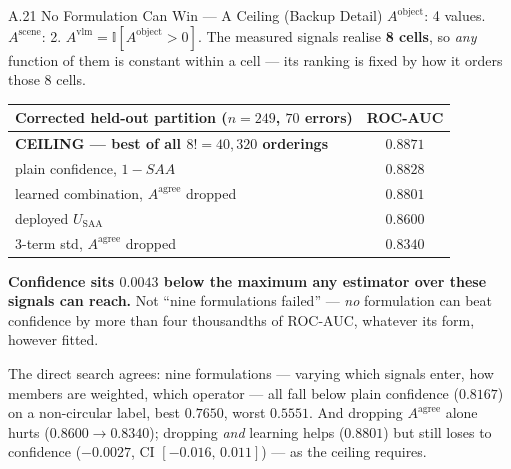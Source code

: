 \documentclass[aspectratio=169,11pt]{beamer}
\begin{document}
\begin{frame}{A.21 No Formulation Can Win --- A Ceiling (Backup Detail)}
\scriptsize
$A^{\text{object}}$: 4 values. $A^{\text{scene}}$: 2. $A^{\text{vlm}}=\mathbb{I}[A^{\text{object}}>0]$. The measured signals realise \textbf{8 cells}, so \emph{any} function of them is constant within a cell --- its ranking is fixed by how it orders those 8 cells.
\vspace{1mm}
\begin{center}
\footnotesize
\begin{tabular}{@{}l c@{}}
\toprule
\textbf{Corrected held-out partition ($n=249$, $70$ errors)} & \textbf{ROC-AUC} \\
\midrule
\textbf{CEILING --- best of all $8!=40{,}320$ orderings} & $\mathbf{0.8871}$ \\
plain confidence, $1-SAA$ & $0.8828$ \\
learned combination, $A^{\text{agree}}$ dropped & $0.8801$ \\
deployed $U_{\text{SAA}}$ & $0.8600$ \\
3-term std, $A^{\text{agree}}$ dropped & $0.8340$ \\
\bottomrule
\end{tabular}
\end{center}
\vspace{1mm}
\textbf{Confidence sits $0.0043$ below the maximum any estimator over these signals can reach.} Not ``nine formulations failed'' --- \emph{no} formulation can beat confidence by more than four thousandths of ROC-AUC, whatever its form, however fitted.
\vspace{1mm}

\scriptsize The direct search agrees: nine formulations --- varying which signals enter, how members are weighted, which operator --- all fall below plain confidence ($0.8167$) on a non-circular label, best $0.7650$, worst $0.5551$. And dropping $A^{\text{agree}}$ alone hurts ($0.8600\!\to\!0.8340$); dropping \emph{and} learning helps ($0.8801$) but still loses to confidence ($-0.0027$, CI $[-0.016,\,0.011]$) --- as the ceiling requires.
\end{frame}
\end{document}
